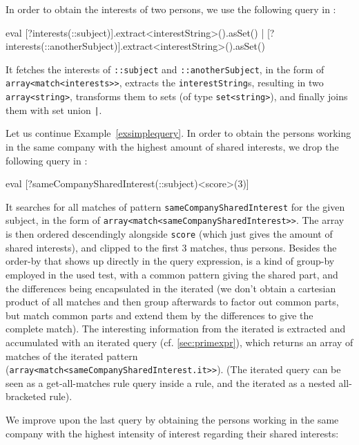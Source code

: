 \begin{example}
In order to obtain the interests of two persons, we use the following query in \GrShell:

	\begin{grshell}
eval [?interests(::subject)].extract<interestString>().asSet() | [?interests(::anotherSubject)].extract<interestString>().asSet()
  \end{grshell}
	
It fetches the interests of \texttt{::subject} and \texttt{::anotherSubject}, in the form of \texttt{array<match<interests>>}, extracts the \texttt{interestString}s, resulting in two \texttt{array<string>}, transforms them to sets (of type \texttt{set<string>}), and finally joins them with set union \texttt{|}.

\end{example}


\begin{example}
Let us continue Example~\ref{exsimplequery}. In order to obtain the persons working in the same company with the highest amount of shared interests, we drop the following query in \GrShell:

  \begin{grshell}
eval [?sameCompanySharedInterest(::subject)\orderDescendingBy<score>\keepFirst(3)]
  \end{grshell}

It searches for all matches of pattern \texttt{sameCompanySharedInterest} for the given subject, in the form of \texttt{array<match<sameCompanySharedInterest>>}.
The array is then ordered descendingly alongside \texttt{score} (which just gives the amount of shared interests), and clipped to the first 3 matches, thus persons.
Besides the order-by that shows up directly in the query expression, is a kind of group-by employed in the used test, with a common pattern giving the shared part, and the differences being encapsulated in the iterated (we don't obtain a cartesian product of all matches and then group afterwards to factor out common parts, but match common parts and extend them by the differences to give the complete match).
The interesting information from the iterated is extracted and accumulated with an iterated query (cf. \ref{sec:primexpr}), which returns an array of matches of the iterated pattern (\texttt{array<match<sameCompanySharedInterest.it>>}).
(The iterated query can be seen as a get-all-matches rule query inside a rule, and the iterated as a nested all-bracketed rule).

We improve upon the last query by obtaining the persons working in the same company with the highest intensity of interest regarding their shared interests:


\end{example}
